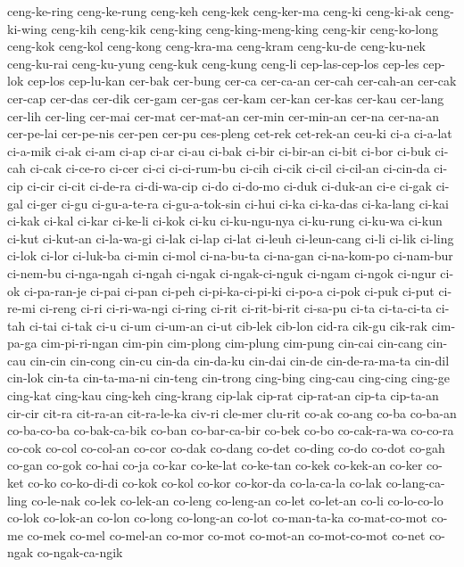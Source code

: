 {ceng-ke-ring ceng-ke-rung ceng-keh ceng-kek ceng-ker-ma ceng-ki ceng-ki-ak
ceng-ki-wing ceng-kih ceng-kik ceng-king ceng-king-meng-king ceng-kir
ceng-ko-long ceng-kok ceng-kol ceng-kong ceng-kra-ma ceng-kram ceng-ku-de
ceng-ku-nek ceng-ku-rai ceng-ku-yung ceng-kuk ceng-kung ceng-li
cep-las-cep-los cep-les cep-lok cep-los cep-lu-kan cer-bak cer-bung cer-ca
cer-ca-an cer-cah cer-cah-an cer-cak cer-cap cer-das cer-dik cer-gam
cer-gas cer-kam cer-kan cer-kas cer-kau cer-lang cer-lih cer-ling cer-mai
cer-mat cer-mat-an cer-min cer-min-an cer-na cer-na-an cer-pe-lai
cer-pe-nis cer-pen cer-pu ces-pleng cet-rek cet-rek-an ceu-ki ci-a
ci-a-lat ci-a-mik ci-ak ci-am ci-ap ci-ar ci-au ci-bak ci-bir ci-bir-an
ci-bit ci-bor ci-buk ci-cah ci-cak ci-ce-ro ci-cer ci-ci ci-ci-rum-bu
ci-cih ci-cik ci-cil ci-cil-an ci-cin-da ci-cip ci-cir ci-cit ci-de-ra
ci-di-wa-cip ci-do ci-do-mo ci-duk ci-duk-an ci-e ci-gak ci-gal ci-ger
ci-gu ci-gu-a-te-ra ci-gu-a-tok-sin ci-hui ci-ka ci-ka-das ci-ka-lang
ci-kai ci-kak ci-kal ci-kar ci-ke-li ci-kok ci-ku ci-ku-ngu-nya ci-ku-rung
ci-ku-wa ci-kun ci-kut ci-kut-an ci-la-wa-gi ci-lak ci-lap ci-lat ci-leuh
ci-leun-cang ci-li ci-lik ci-ling ci-lok ci-lor ci-luk-ba ci-min ci-mol
ci-na-bu-ta ci-na-gan ci-na-kom-po ci-nam-bur ci-nem-bu ci-nga-ngah
ci-ngah ci-ngak ci-ngak-ci-nguk ci-ngam ci-ngok ci-ngur ci-ok ci-pa-ran-je
ci-pai ci-pan ci-peh ci-pi-ka-ci-pi-ki ci-po-a ci-pok ci-puk ci-put
ci-re-mi ci-reng ci-ri ci-ri-wa-ngi ci-ring ci-rit ci-rit-bi-rit ci-sa-pu
ci-ta ci-ta-ci-ta ci-tah ci-tai ci-tak ci-u ci-um ci-um-an ci-ut cib-lek
cib-lon cid-ra cik-gu cik-rak cim-pa-ga cim-pi-ri-ngan cim-pin cim-plong
cim-plung cim-pung cin-cai cin-cang cin-cau cin-cin cin-cong cin-cu cin-da
cin-da-ku cin-dai cin-de cin-de-ra-ma-ta cin-dil cin-lok cin-ta
cin-ta-ma-ni cin-teng cin-trong cing-bing cing-cau cing-cing cing-ge
cing-kat cing-kau cing-keh cing-krang cip-lak cip-rat cip-rat-an cip-ta
cip-ta-an cir-cir cit-ra cit-ra-an cit-ra-le-ka civ-ri cle-mer clu-rit
co-ak co-ang co-ba co-ba-an co-ba-co-ba co-bak-ca-bik co-ban co-bar-ca-bir
co-bek co-bo co-cak-ra-wa co-co-ra co-cok co-col co-col-an co-cor co-dak
co-dang co-det co-ding co-do co-dot co-gah co-gan co-gok co-hai co-ja
co-kar co-ke-lat co-ke-tan co-kek co-kek-an co-ker co-ket co-ko
co-ko-di-di co-kok co-kol co-kor co-kor-da co-la-ca-la co-lak
co-lang-ca-ling co-le-nak co-lek co-lek-an co-leng co-leng-an co-let
co-let-an co-li co-lo-co-lo co-lok co-lok-an co-lon co-long co-long-an
co-lot co-man-ta-ka co-mat-co-mot co-me co-mek co-mel co-mel-an co-mor
co-mot co-mot-an co-mot-co-mot co-net co-ngak co-ngak-ca-ngik
}
